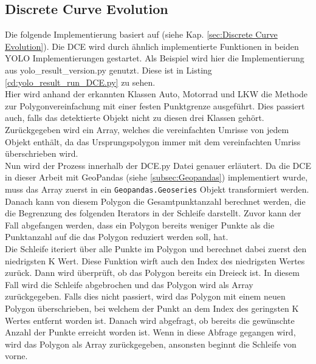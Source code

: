 \subsection{Discrete Curve Evolution}{
	\label{py:DCE}
	Die folgende Implementierung basiert auf \citeauthor{Barkowsky2000} \citep{Barkowsky2000} (siehe Kap. \ref{sec:Discrete Curve Evolution}). Die DCE wird durch ähnlich implementierte Funktionen in beiden YOLO Implementierungen gestartet. Als Beispiel wird hier die Implementierung aus yolo\_result\_version.py genutzt. Diese ist in Listing \ref{cd:yolo_result_run_DCE.py} zu sehen. \\
	Hier wird anhand der erkannten Klassen Auto, Motorrad und LKW die Methode zur Polygonvereinfachung mit einer festen Punktgrenze ausgeführt. Dies passiert auch, falls das detektierte Objekt nicht zu diesen drei Klassen gehört. \\ 
	
	Zurückgegeben wird ein Array, welches die vereinfachten Umrisse von jedem Objekt enthält, da das Ursprungspolygon immer mit dem vereinfachten Umriss überschrieben wird. \\

	Nun wird der Prozess innerhalb der DCE.py Datei genauer erläutert. Da die DCE in dieser Arbeit mit GeoPandas (siehe \ref{subsec:Geopandas}) implementiert wurde, muss das Array zuerst in ein \lstinline|Geopandas.Geoseries| Objekt transformiert werden. Danach kann von diesem Polygon die Gesamtpunktanzahl berechnet werden, die die Begrenzung des folgenden Iterators in der Schleife darstellt. Zuvor kann der Fall abgefangen werden, dass ein Polygon bereits weniger Punkte als die Punktanzahl auf die das Polygon reduziert werden soll, hat. \\
	
	Die Schleife iteriert über alle Punkte im Polygon und berechnet dabei zuerst den niedrigsten K Wert. Diese Funktion wirft auch den Index des niedrigsten Wertes zurück. Dann wird überprüft, ob das Polygon bereits ein Dreieck ist. In diesem Fall wird die Schleife abgebrochen und das Polygon wird als Array zurückgegeben. Falls dies nicht passiert, wird das Polygon mit einem neuen Polygon überschrieben, bei welchem der Punkt an dem Index des geringsten K Wertes entfernt worden ist. Danach wird abgefragt, ob bereits die gewünschte Anzahl der Punkte erreicht worden ist. Wenn in diese Abfrage gegangen wird, wird das Polygon als Array zurückgegeben, ansonsten beginnt die Schleife von vorne. \\

}
